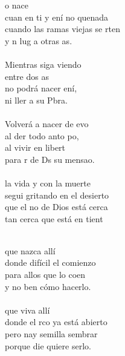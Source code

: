 \begin{cancion}%
	o nace  \\
	cuan en ti y ení no quenada\\
	cuando las ramas viejas se rten\\
	y n lug a otras as.\\
\jump\\
	Mientras siga viendo   \\
	entre dos as \\
	no podrá nacer ení,\\
	ni ller a  su Pbra. \\
\jump\\
	Volverá a nacer de evo\\
	al der todo anto po, \\
	al vivir en libert\\
	para r de Ds su mensao.\\
\jump\\
	 la vida y con la muerte\\
	segui gritando en el desierto  \\
	que el no de Dios está cerca\\
	tan cerca que está en tient\\\jump\\
	\begin{chorus}%
	 que nazca allí\\
	donde  difícil el comienzo\\
	para allos que lo coen\\
	y no ben cómo hacerlo.\\
\jump\\
	 que viva allí\\
	donde el rco ya está abierto\\
	pero nay semilla  sembrar\\
	porque die quiere serlo.\\

\end{chorus}
\end{cancion}
